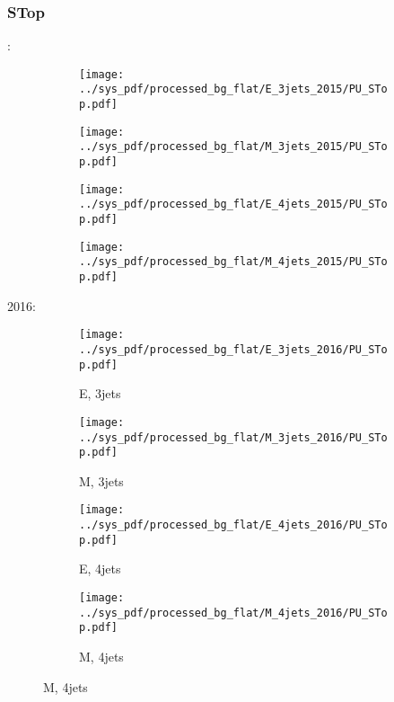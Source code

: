 \documentclass{beamer}
\begin{document}
\begin{frame}
\frametitle{STop}
\fontsize{5}{1}:
\begin{figure}
\centering
\begin{subfigure}[b]{0.24\textwidth}
\texttt{[image: ../sys\_pdf/processed\_bg\_flat/E\_3jets\_2015/PU\_STop.pdf]}
\end{subfigure}
\begin{subfigure}[b]{0.24\textwidth}
\texttt{[image: ../sys\_pdf/processed\_bg\_flat/M\_3jets\_2015/PU\_STop.pdf]}
\end{subfigure}
\begin{subfigure}[b]{0.24\textwidth}
\texttt{[image: ../sys\_pdf/processed\_bg\_flat/E\_4jets\_2015/PU\_STop.pdf]}
\end{subfigure}
\begin{subfigure}[b]{0.24\textwidth}
\texttt{[image: ../sys\_pdf/processed\_bg\_flat/M\_4jets\_2015/PU\_STop.pdf]}
\end{subfigure}
\end{figure}
2016:
\begin{figure}
\centering
\begin{subfigure}[b]{0.24\textwidth}
\texttt{[image: ../sys\_pdf/processed\_bg\_flat/E\_3jets\_2016/PU\_STop.pdf]}
\captionsetup{font=tiny}
\caption{E, 3jets}
\end{subfigure}
\begin{subfigure}[b]{0.24\textwidth}
\texttt{[image: ../sys\_pdf/processed\_bg\_flat/M\_3jets\_2016/PU\_STop.pdf]}
\captionsetup{font=tiny}
\caption{M, 3jets}
\end{subfigure}
\begin{subfigure}[b]{0.24\textwidth}
\texttt{[image: ../sys\_pdf/processed\_bg\_flat/E\_4jets\_2016/PU\_STop.pdf]}
\captionsetup{font=tiny}
\caption{E, 4jets}
\end{subfigure}
\begin{subfigure}[b]{0.24\textwidth}
\texttt{[image: ../sys\_pdf/processed\_bg\_flat/M\_4jets\_2016/PU\_STop.pdf]}
\captionsetup{font=tiny}
\caption{M, 4jets}
\end{subfigure}
\end{figure}
\end{frame}
\end{document}
